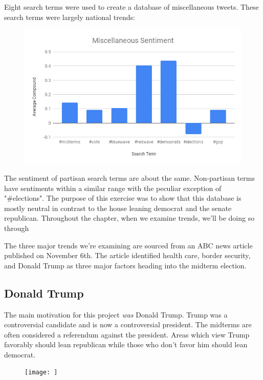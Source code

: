 \documentclass[11pt, twoside, reqno]{article}
\begin{document}
Eight search terms were used to create a database of miscellaneous tweets. These search terms were largely national trends:

\begin{figure}[H]
	\includegraphics[scale=0.5]{misc_sent}
\end{figure}

The sentiment of partisan search terms are about the same. Non-partisan terms have sentiments within a similar range with the peculiar exception of "\#elections". The purpose of this exercise was to show that this database is mostly neutral in contrast to the house leaning democrat and the senate republican. Throughout the chapter, when we examine trends, we'll be doing so through 

The three major trends we're examining are sourced from an ABC news article published on November 6th. The article identified health care, border security, and Donald Trump as three major factors heading into the midterm election. 

\subsection{Donald Trump}
The main motivation for this project \textit{was} Donald Trump. Trump was a controversial candidate and is now a controversial president. The midterms are often considered a referendum against the president. Areas which view Trump favorably should lean republican while those who don't favor him should lean democrat.

\begin{figure}[H]
	\texttt{[image: ]}	
\end{figure}
\end{document}
